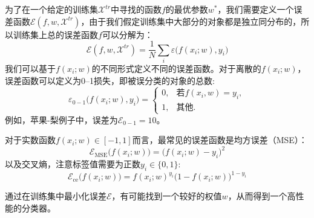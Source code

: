 \documentclass{ctexrep}
\begin{document}
为了在一个给定的训练集$\mathcal{X}^{tr}$中寻找的函数$f$的最优参数$w^*$，我们需要定义一个误差函数$\mathcal{E}(f, w, \mathcal{X}^{tr})$，由于我们假定训练集中大部分的对象都是独立同分布的，所以训练集上总的误差函数$f$可以分解为：
\begin{equation}
\mathcal{E}(f, w, \mathcal{X}^{tr}) = \frac{1}{N}\sum\limits_i \varepsilon\big(f(x_i; w), y_i\big)
\end{equation}
我们可以基于$f(x_i; w)$的不同形式定义不同的误差函数。对于离散的$f(x_i; w)$，误差函数可以定义为0--1损失，即被误分类的对象的总数:
\begin{equation}
\varepsilon_{0-1}\big(f(x_i;w), y_i\big) = \left\{
\begin{array}{cc}
0, & \text{若}f(x_i, w)=y_i,\\
1, & \text{其他}.
\end{array}
\right.
\end{equation}
例如，苹果-梨例子中，误差为$\mathcal{E}_{0-1}=10$。

对于实数函数$f(x_i; w)\in[-1,1]$而言，最常见的误差函数是均方误差（MSE）：
\begin{equation}
\mathcal{E}_{\text{MSE}}\big(f(x_i;w)\big) = \big(f(x_i;w)-y_i\big)^2
\end{equation}
以及交叉熵，注意标签值需要为正数$y_i\in\{0,1\}$:
\begin{equation}
\mathcal{E}_{\text{ce}}\big(f(x_i;w)\big) = f(x_i;w)^{y_i}\big(1-f(x_i;w)\big)^{1-y_i}
\end{equation}

通过在训练集中最小化误差$\mathcal{E}$，有可能找到一个较好的权值$w$，从而得到一个高性能的分类器。
\end{document}
